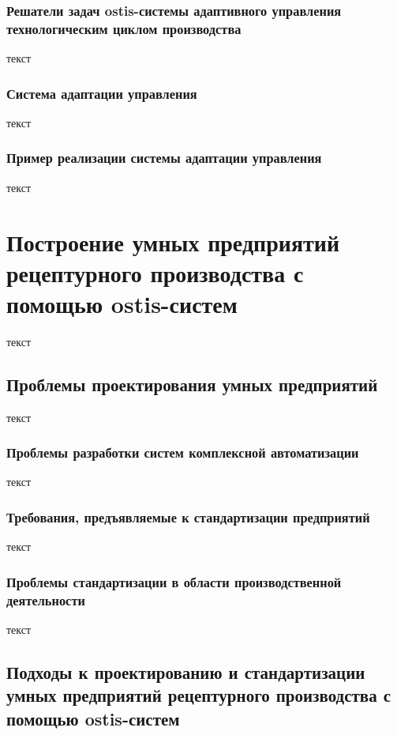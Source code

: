 \subsubsection{Решатели задач ostis-системы адаптивного управления технологическим циклом производства}

текст

\subsubsection{Система адаптации управления}

текст

\subsubsection{Пример реализации системы адаптации управления}

текст

\section{Построение умных предприятий рецептурного производства с помощью ostis-систем}

текст

\subsection{Проблемы проектирования умных предприятий}

текст

\subsubsection{Проблемы разработки систем комплексной автоматизации}

текст

\subsubsection{Требования, предъявляемые к стандартизации предприятий}

текст

\subsubsection{Проблемы стандартизации в области производственной деятельности}

текст

\subsection{Подходы к проектированию и стандартизации умных предприятий рецептурного производства с помощью ostis-систем}

